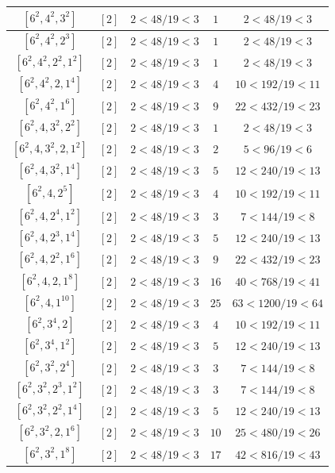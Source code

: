 \documentclass{article}%
\begin{document}
\begin{center}
\begin{longtable}{||c|c|c|c|c||}
$[6^{2}, 4^{2}, 3^{2}]$ & $[2]$ & $2 < 48/19 < 3$ & $1$ & $2 < 48/19 < 3$ \\ \hline 
$[6^{2}, 4^{2}, 2^{3}]$ & $[2]$ & $2 < 48/19 < 3$ & $1$ & $2 < 48/19 < 3$ \\ \hline 
$[6^{2}, 4^{2}, 2^{2}, 1^{2}]$ & $[2]$ & $2 < 48/19 < 3$ & $1$ & $2 < 48/19 < 3$ \\ \hline 
$[6^{2}, 4^{2}, 2, 1^{4}]$ & $[2]$ & $2 < 48/19 < 3$ & $4$ & $10 < 192/19 < 11$ \\ \hline 
$[6^{2}, 4^{2}, 1^{6}]$ & $[2]$ & $2 < 48/19 < 3$ & $9$ & $22 < 432/19 < 23$ \\ \hline 
$[6^{2}, 4, 3^{2}, 2^{2}]$ & $[2]$ & $2 < 48/19 < 3$ & $1$ & $2 < 48/19 < 3$ \\ \hline 
$[6^{2}, 4, 3^{2}, 2, 1^{2}]$ & $[2]$ & $2 < 48/19 < 3$ & $2$ & $5 < 96/19 < 6$ \\ \hline 
$[6^{2}, 4, 3^{2}, 1^{4}]$ & $[2]$ & $2 < 48/19 < 3$ & $5$ & $12 < 240/19 < 13$ \\ \hline 
$[6^{2}, 4, 2^{5}]$ & $[2]$ & $2 < 48/19 < 3$ & $4$ & $10 < 192/19 < 11$ \\ \hline 
$[6^{2}, 4, 2^{4}, 1^{2}]$ & $[2]$ & $2 < 48/19 < 3$ & $3$ & $7 < 144/19 < 8$ \\ \hline 
$[6^{2}, 4, 2^{3}, 1^{4}]$ & $[2]$ & $2 < 48/19 < 3$ & $5$ & $12 < 240/19 < 13$ \\ \hline 
$[6^{2}, 4, 2^{2}, 1^{6}]$ & $[2]$ & $2 < 48/19 < 3$ & $9$ & $22 < 432/19 < 23$ \\ \hline 
$[6^{2}, 4, 2, 1^{8}]$ & $[2]$ & $2 < 48/19 < 3$ & $16$ & $40 < 768/19 < 41$ \\ \hline 
$[6^{2}, 4, 1^{10}]$ & $[2]$ & $2 < 48/19 < 3$ & $25$ & $63 < 1200/19 < 64$ \\ \hline 
$[6^{2}, 3^{4}, 2]$ & $[2]$ & $2 < 48/19 < 3$ & $4$ & $10 < 192/19 < 11$ \\ \hline 
$[6^{2}, 3^{4}, 1^{2}]$ & $[2]$ & $2 < 48/19 < 3$ & $5$ & $12 < 240/19 < 13$ \\ \hline 
$[6^{2}, 3^{2}, 2^{4}]$ & $[2]$ & $2 < 48/19 < 3$ & $3$ & $7 < 144/19 < 8$ \\ \hline 
$[6^{2}, 3^{2}, 2^{3}, 1^{2}]$ & $[2]$ & $2 < 48/19 < 3$ & $3$ & $7 < 144/19 < 8$ \\ \hline 
$[6^{2}, 3^{2}, 2^{2}, 1^{4}]$ & $[2]$ & $2 < 48/19 < 3$ & $5$ & $12 < 240/19 < 13$ \\ \hline 
$[6^{2}, 3^{2}, 2, 1^{6}]$ & $[2]$ & $2 < 48/19 < 3$ & $10$ & $25 < 480/19 < 26$ \\ \hline 
$[6^{2}, 3^{2}, 1^{8}]$ & $[2]$ & $2 < 48/19 < 3$ & $17$ & $42 < 816/19 < 43$ \\ \hline 

\end{longtable}
\end{center}
\end{document}
